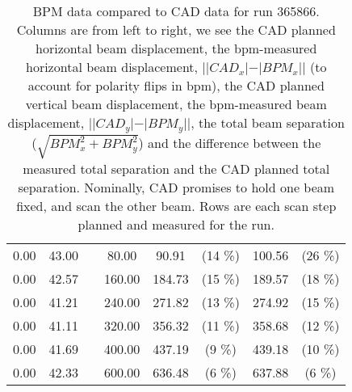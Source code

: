 \begin{table}
\begin{tabular}{c c c c c c c c}
0.00 & 43.00 &  & 80.00 & 90.91 &  (14 \%) & 100.56 &  (26 \%)\\
0.00 & 42.57 &  & 160.00 & 184.73 &  (15 \%) & 189.57 &  (18 \%)\\
0.00 & 41.21 &  & 240.00 & 271.82 &  (13 \%) & 274.92 &  (15 \%)\\
0.00 & 41.11 &  & 320.00 & 356.32 &  (11 \%) & 358.68 &  (12 \%)\\
0.00 & 41.69 &  & 400.00 & 437.19 &  (9 \%) & 439.18 &  (10 \%)\\
0.00 & 42.33 &  & 600.00 & 636.48 &  (6 \%) & 637.88 &  (6 \%)\\
\bottomrule
\end{tabular}
\caption{ BPM data compared to CAD data for run 365866. Columns are from left to right, we see the CAD planned horizontal beam displacement, the bpm-measured horizontal beam displacement, $||CAD_{x}| - |BPM_{x}||$ (to account for polarity flips in bpm), the CAD planned vertical beam displacement, the bpm-measured beam displacement, $||CAD_{y}| - |BPM_{y}||$, the total beam separation ($\sqrt{BPM_{x}^2+BPM_{y}^2}$) and the difference between the measured total separation and the CAD planned total separation. Nominally, CAD promises to hold one beam fixed, and scan the other beam. Rows are each scan step planned and measured for the run. }
\label{0xffd6370c}
\end{table}

